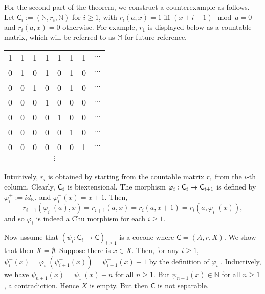 \documentclass{LMCS}
\begin{document}
For the second part of the theorem, we construct a counterexample as
follows. Let $\mathsf{C}_i := ( \mathbb{N}, r_i, \mathbb{N} )$ for $i\geq
1$, with $r_i (a, x) = 1$ iff $(x+i - 1) \mod a  = 0$ and
$r_i(a,x)=0$ otherwise. For example, $r_1$ is displayed below as
a countable matrix, which will be referred to as $\mathbb{M}$ for future
reference. 

\begin{center}
\begin{tabular}{| c c c  c  c  c c c c c  |}\hline
   1 & 1 & 1 & 1 & 1 & 1 & 1 &   \multicolumn{3}{c|}{$\cdots$} \\
   0 & 1 & 0 & 1 & 0 & 1 & 0 &   \multicolumn{3}{c|}{$\cdots$} \\
      0 & 0 & 1 & 0 & 0 & 1 & 0 &   \multicolumn{3}{c|}{$\cdots$}\\
            0 & 0 & 0 & 1 & 0 & 0 & 0 &   \multicolumn{3}{c|}{$\cdots$}\\
                        0 & 0 & 0 & 0 & 1 & 0 & 0 &   \multicolumn{3}{c|}{$\cdots$}\\
                         0 & 0 & 0 & 0 & 0 & 1 & 0 &   \multicolumn{3}{c|}{$\cdots$} \\
                               0 & 0 & 0 & 0 & 0 & 0 & 1 &  \multicolumn{3}{c|}{$\cdots$} \\
           \multicolumn{10}{|c|}{$\vdots$} \\ \hline
   \end{tabular}
\end{center}
Intuitively, $r_i$ is obtained by starting
from the countable matrix $r_1$ from the $i$-th column. Clearly, ${\sf
  C}_i$ is biextensional. The morphism $\varphi_i: \mathsf{C}_{i}\to {\sf
  C}_{i+1}$ is defined by $\varphi_i^+ := id_{ \mathbb{N}}$, and
$\varphi_i^- (x) = x+1$. Then,
$$r_{i+1} (\varphi_i^+(a), x) = r_{i+1}( a, x) = r_i(a, x+1) = r_i(a, \varphi_i^- (x)),$$
and so $\varphi_i$ is indeed a Chu morphism for each $i\geq 1$. 


Now assume that $(\psi_i:\mathsf{C}_i \to \mathsf{C})_{i \geq 1}$ is a cocone
where $\mathsf{C}=(A,r,X)$. We show that then $X = \emptyset$. Suppose
there is $x \in X$. Then, for any $i \geq
1$, $\psi_i^-(x)= \varphi_i^-(\psi_{i+1}^-(x))=\psi_{i+1}^-(x)+1$ by
the definition of $\varphi_i^-$. 
Inductively, we have $ \psi_{n+1}^-(x) = \psi_1^-(x) - n$ for all
$n\geq 1$.  But $ \psi_{n+1}^-(x) \in \mathbb{N}$ for all $n \geq 1$,
a contradiction.  Hence $X$ is empty. But then $\mathsf{C}$ is not
separable. 
\end{document}
